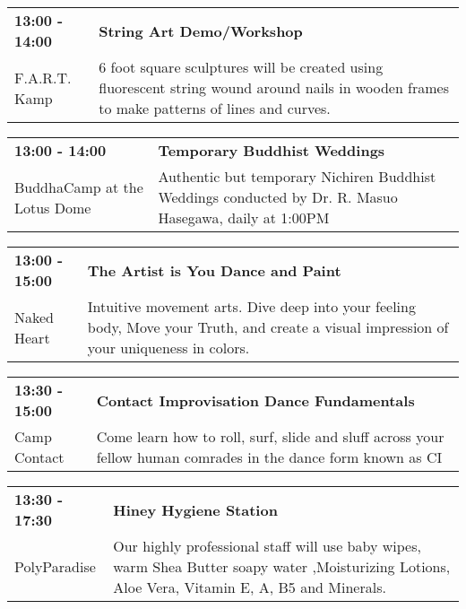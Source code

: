 \begin{tabular}{ p{1in} p{2.2in} }
    \textbf{13:00 - 14:00} & \textbf{String Art Demo/Workshop} \\
    F.A.R.T. Kamp \newline  & 6 foot square sculptures will be created using fluorescent string wound around nails in wooden frames to make patterns of lines and curves. \\
    \hline 
\end{tabular}
    
\begin{tabular}{ p{1in} p{2.2in} }
    \textbf{13:00 - 14:00} & \textbf{Temporary Buddhist Weddings} \\
    BuddhaCamp at the Lotus Dome \newline  & Authentic but temporary Nichiren Buddhist Weddings conducted by Dr. R. Masuo Hasegawa, daily at 1:00PM \\
    \hline 
\end{tabular}
    
\begin{tabular}{ p{1in} p{2.2in} }
    \textbf{13:00 - 15:00} & \textbf{The Artist is You Dance and Paint} \\
    Naked Heart \newline  & Intuitive movement arts. Dive deep into your feeling body, Move your Truth, and create a visual impression of your uniqueness in colors. \\
    \hline 
\end{tabular}
    
\begin{tabular}{ p{1in} p{2.2in} }
    \textbf{13:30 - 15:00} & \textbf{Contact Improvisation Dance Fundamentals} \\
    Camp Contact \newline  & Come learn how to roll, surf, slide and sluff across your fellow human comrades in the dance form known as CI \\
    \hline 
\end{tabular}
    
\begin{tabular}{ p{1in} p{2.2in} }
    \textbf{13:30 - 17:30} & \textbf{Hiney Hygiene Station} \\
    PolyParadise \newline  & Our highly professional staff  will use baby wipes, warm Shea Butter soapy water ,Moisturizing Lotions, Aloe Vera, Vitamin E, A, B5 and Minerals. \\
    \hline 
\end{tabular}
    
